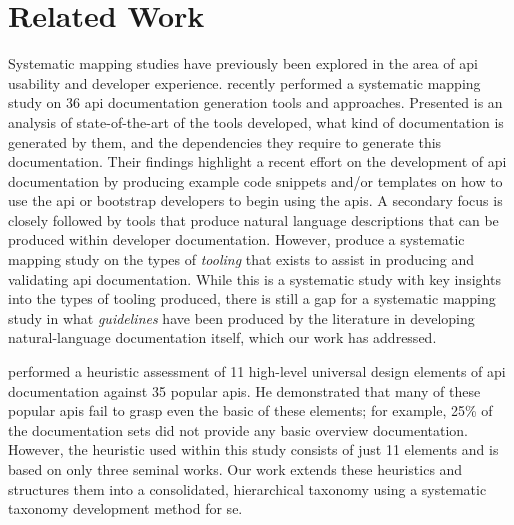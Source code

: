 \section{Related Work}
\label{esem2019:sec:related-work}

Systematic mapping studies have previously been explored in the area of \gls{api} usability and developer experience. \citet{Nybom:2018ef} recently performed a systematic mapping study on 36 \gls{api} documentation generation tools and approaches. Presented is an analysis of state-of-the-art of the tools developed, what kind of documentation is generated by them, and the dependencies they require to generate this documentation. Their findings highlight a recent effort on the development of \gls{api} documentation by producing example code snippets and/or templates on how to use the \gls{api} or bootstrap developers to begin using the \glspl{api}. A secondary focus is closely followed by tools that produce natural language descriptions that can be produced within developer documentation. %
However, \citeauthor{Nybom:2018ef} produce a systematic mapping study on the types of \textit{tooling} that exists to assist in producing and validating \gls{api} documentation. While this is a systematic study with key insights into the types of tooling produced, there is still a gap for a systematic mapping study in what \textit{guidelines} have been produced by the literature in developing natural-language documentation itself, which our work has addressed.

\citet{Watson:2012uy} performed a heuristic assessment of 11 high-level universal design elements of \gls{api} documentation against 35 popular \glspl{api}. He demonstrated that many of these popular \glspl{api} fail to grasp even the basic of these elements; for example, 25\% of the documentation sets did not provide any basic overview documentation. However, the heuristic used within this study consists of just 11 elements and is based on only three seminal works. Our work extends these heuristics and structures them into a consolidated, hierarchical taxonomy using a systematic taxonomy development method for \gls{se}.

